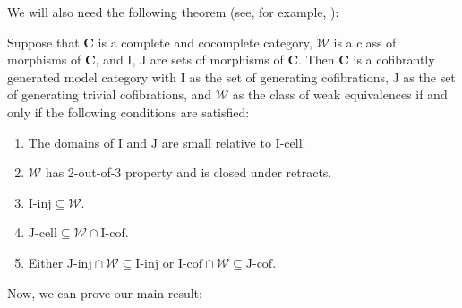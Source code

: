 \documentclass[reqno]{amsart}
\theoremstyle{definition}
\theoremstyle{remark}
\newcommand{\cat}[1]{\mathbf{#1}}
\newcommand{\C}{\cat{C}}
\newcommand{\we}{\mathcal{W}}
\newcommand{\I}{\mathrm{I}}
\newcommand{\J}{\mathrm{J}}
\newcommand{\class}[2]{#1\text{-}\mathrm{#2}}
\newcommand{\Icell}[1][\I]{\class{#1}{cell}}
\newcommand{\Icof}[1][\I]{\class{#1}{cof}}
\newcommand{\Iinj}[1][\I]{\class{#1}{inj}}
\newcommand{\Jinj}[1][]{\Iinj[\J#1]}
\newcommand{\Jcell}[1][]{\Icell[\J#1]}
\newcommand{\Jcof}[1][]{\Icof[\J#1]}
\numberwithin{figure}{section}
\begin{document}
We will also need the following theorem (see, for example, \cite[Theorem~2.1.19]{hovey}):
\begin{thm}
Suppose that $\C$ is a complete and cocomplete category, $\we$ is a class of morphisms of $\C$, and $\I$, $\J$ are sets of morphisms of $\C$.
Then $\C$ is a cofibrantly generated model category with $\I$ as the set of generating cofibrations,
$\J$ as the set of generating trivial cofibrations, and $\we$ as the class of weak equivalences if and only if the following conditions are satisfied:
\begin{enumerate}
\item The domains of $\I$ and $\J$ are small relative to $\Icell$.
\item $\we$ has 2-out-of-3 property and is closed under retracts.
\item $\Iinj \subseteq \we$.
\item $\Jcell \subseteq \we \cap \Icof$.
\item Either $\Jinj \cap \we \subseteq \Iinj$ or $\Icof \cap \we \subseteq \Jcof$.
\end{enumerate}
\end{thm}

Now, we can prove our main result:
\end{document}
